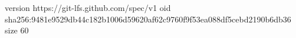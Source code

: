 version https://git-lfs.github.com/spec/v1
oid sha256:9481e9529db44c182b1006d59620af62c9760f9f53ea088df5cebd2190b6db36
size 60
